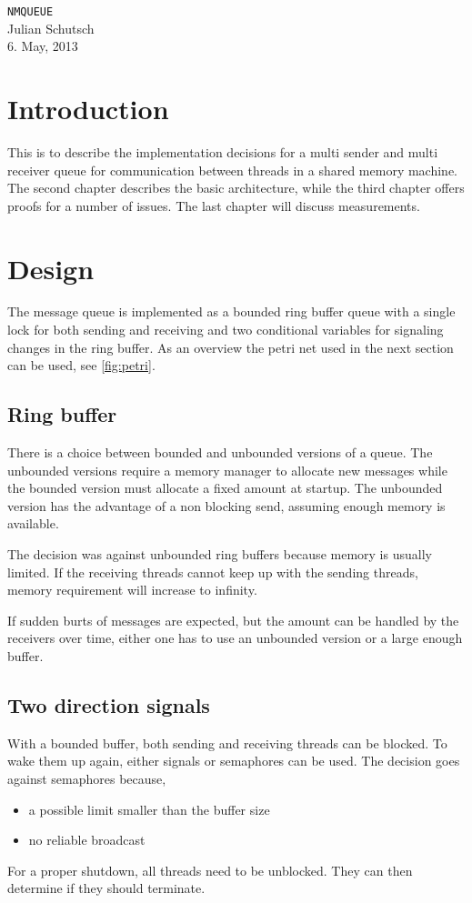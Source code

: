 \documentclass[12pt]{article}
\begin{document}
\titlepage
{
 \begin{center}
  \Large{\texttt{NMQUEUE}}\\
  Julian Schutsch\\
  6. May, 2013
  \tableofcontents
 \end{center}
}
\newpage
\setcounter{page}{1}
\section{Introduction}
This is to describe the implementation decisions for a multi sender and multi receiver queue
for communication between threads in a shared memory machine.
The second chapter describes the basic architecture, while the third chapter offers proofs
for a number of issues.
The last chapter will discuss measurements.

\section{Design}
The message queue is implemented as a bounded ring buffer queue with a single lock for both
sending and receiving and two conditional variables for signaling changes in the ring buffer.
As an overview the petri net used in the next section can be used, see \ref{fig:petri}.

\subsection{Ring buffer}
There is a choice between bounded and unbounded versions of a queue.
The unbounded versions require a memory manager to allocate new messages
while the bounded version must allocate a fixed amount at startup.
The unbounded version has the advantage of a non blocking send, assuming
enough memory is available.

The decision was against unbounded ring buffers because memory is usually limited.
If the receiving threads cannot keep up with the sending threads, memory
requirement will increase to infinity.

If sudden burts of messages are expected, but the amount can be handled by the
receivers over time, either one has to use an unbounded version or a large
enough buffer.

\subsection{Two direction signals}
With a bounded buffer, both sending and receiving threads can be blocked.
To wake them up again, either signals or semaphores can be used.
The decision goes against semaphores because,
\begin{itemize}
 \item a possible limit smaller than the buffer size
 \item no reliable broadcast
\end{itemize}
For a proper shutdown, all threads need to be unblocked. They can then
determine if they should terminate.
\end{document}
